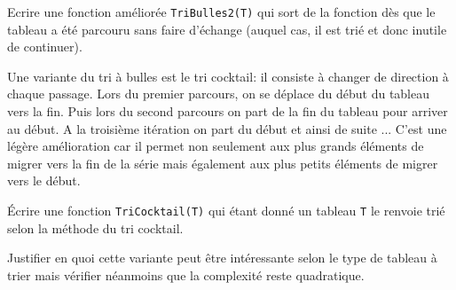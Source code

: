 \q Ecrire une fonction améliorée \texttt{TriBulles2(T)} qui sort de la fonction dès que le tableau a été parcouru sans faire d'échange (auquel cas, il est trié et donc inutile de continuer).

\q Une variante du tri à bulles est le tri cocktail: il consiste à changer de direction à chaque passage. Lors
du premier parcours, on se déplace du début du tableau vers la fin. Puis lors du second parcours on
part de la fin du tableau pour arriver au début. A la troisième itération on part du début et ainsi de
suite ... C'est une légère amélioration car il permet non seulement aux plus grands éléments de
migrer vers la fin de la série mais également aux plus petits éléments de migrer vers le début.

\medskip \'Ecrire une fonction \texttt{TriCocktail(T)} qui étant donné un tableau \texttt{T} le renvoie trié selon la méthode du tri cocktail.

Justifier en quoi cette variante peut être intéressante selon le type de tableau à trier mais vérifier néanmoins que la complexité reste quadratique.

\ee








 

 \fin
